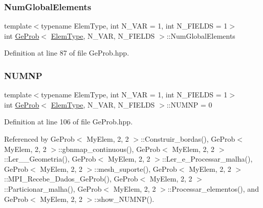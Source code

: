 \subsubsection{\texorpdfstring{Num\+Global\+Elements}{NumGlobalElements}}
{\footnotesize\ttfamily template$<$typename Elem\+Type, int N\+\_\+\+V\+AR = 1, int N\+\_\+\+F\+I\+E\+L\+DS = 1$>$ \\
int \hyperlink{classGeProb}{Ge\+Prob}$<$ \hyperlink{spectral_8h_aaa2c1a7b2d1b12c590d730fe6ac839fa}{Elem\+Type}, N\+\_\+\+V\+AR, N\+\_\+\+F\+I\+E\+L\+DS $>$\+::Num\+Global\+Elements\hspace{0.3cm}{\ttfamily [protected]}}



Definition at line 87 of file Ge\+Prob.\+hpp.

\mbox{\label{classGeProb_adf7ed4cdeae11b7e6f15acc0ca7c1d21}} 
\subsubsection{\texorpdfstring{N\+U\+M\+NP}{NUMNP}}
{\footnotesize\ttfamily template$<$typename Elem\+Type, int N\+\_\+\+V\+AR = 1, int N\+\_\+\+F\+I\+E\+L\+DS = 1$>$ \\
int \hyperlink{classGeProb}{Ge\+Prob}$<$ \hyperlink{spectral_8h_aaa2c1a7b2d1b12c590d730fe6ac839fa}{Elem\+Type}, N\+\_\+\+V\+AR, N\+\_\+\+F\+I\+E\+L\+DS $>$\+::N\+U\+M\+NP = 0\hspace{0.3cm}{\ttfamily [protected]}}



Definition at line 106 of file Ge\+Prob.\+hpp.



Referenced by Ge\+Prob$<$ My\+Elem, 2, 2 $>$\+::\+Construir\+\_\+bordas(), Ge\+Prob$<$ My\+Elem, 2, 2 $>$\+::gbnmap\+\_\+continuous(), Ge\+Prob$<$ My\+Elem, 2, 2 $>$\+::\+Ler\+\_\+\+\_\+\+Geometria(), Ge\+Prob$<$ My\+Elem, 2, 2 $>$\+::\+Ler\+\_\+e\+\_\+\+Processar\+\_\+malha(), Ge\+Prob$<$ My\+Elem, 2, 2 $>$\+::mesh\+\_\+suporte(), Ge\+Prob$<$ My\+Elem, 2, 2 $>$\+::\+M\+P\+I\+\_\+\+Recebe\+\_\+\+Dados\+\_\+\+Ge\+Prob(), Ge\+Prob$<$ My\+Elem, 2, 2 $>$\+::\+Particionar\+\_\+malha(), Ge\+Prob$<$ My\+Elem, 2, 2 $>$\+::\+Processar\+\_\+elementos(), and Ge\+Prob$<$ My\+Elem, 2, 2 $>$\+::show\+\_\+\+N\+U\+M\+N\+P().

\mbox{\label{classGeProb_ab269c3e7eeb6ae7c5fd87ae54df757b2}} 
